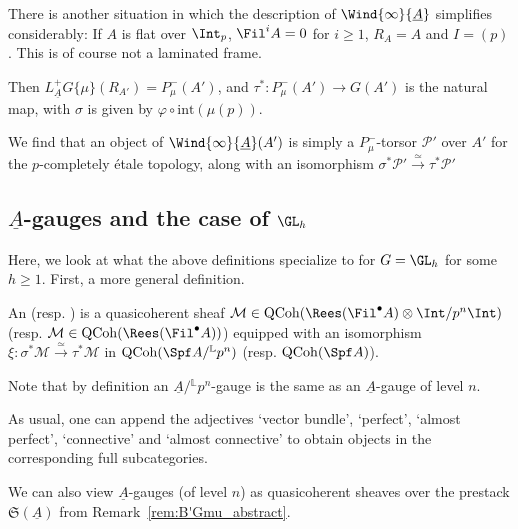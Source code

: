 \documentclass[10pt]{amsart}
\begin{document}
\begin{remark}
\label{rem:trivial_filtration_displays}
There is another situation in which the description of $\Wind{\infty}{\underline{A}}$ simplifies considerably: If $A$ is flat over $\Int_p$, $\Fil^iA = 0$ for $i\ge 1$, $R_A = A$ and $I = (p)$. This is of course not a laminated frame.

Then $L^+_{\underline{A}}G\{\mu\}(R_{A'}) = P^-_\mu(A')$, and $\tau^*:P^-_\mu(A')\to G(A')$ is the natural map, with $\sigma$ is given by $\varphi\circ \mathrm{int}(\mu(p))$. 

We find that an object of $\Wind{\infty}{\underline{A}}(A')$ is simply a $P^-_\mu$-torsor $\mathcal{P}'$ over $A'$ for the $p$-completely \'etale topology, along with an isomorphism $\sigma^* \mathcal{P}'\xrightarrow{\simeq}\tau^* \mathcal{P}'$
\end{remark}

\subsection{$\underline{A}$-gauges and the case of $\GL_h$}
\label{subsec:A_gauges}

Here, we look at what the above definitions specialize to for $G = \GL_h$ for some $h\ge 1$. First, a more general definition.

\begin{definition}
An  (resp. ) is a quasicoherent sheaf $\mathcal{M}\in \mathrm{QCoh}(\Rees(\Fil^\bullet A)\otimes\Int/p^n\Int)$ (resp. $\mathcal{M}\in \mathrm{QCoh}(\Rees(\Fil^\bullet A))$) equipped with an isomorphism $\xi:\sigma^*\mathcal{M}\xrightarrow{\simeq}\tau^*\mathcal{M}$ in $\mathrm{QCoh}(\Spf A/{}^{\mathbb{L}}p^n)$ (resp. $\mathrm{QCoh}(\Spf A)$).

Note that by definition an $\underline{A}/{}^{\mathbb{L}}p^n$-gauge is the same as an $\underline{A}$-gauge of level $n$. 

As usual, one can append the adjectives `vector bundle', `perfect', `almost perfect', `connective' and `almost connective' to obtain objects in the corresponding full subcategories.
\end{definition}

\begin{remark}
We can also view $\underline{A}$-gauges (of level $n$) as quasicoherent sheaves over the prestack $\mathfrak{S}(\underline{A})$ from Remark~\ref{rem:B'Gmu_abstract}.
\end{remark}
\end{document}
